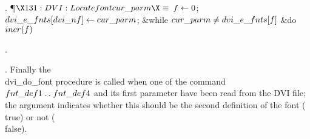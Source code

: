 . \P$\X131:DVI: Locate font \\{cur\_parm}\X\S$\6
$\|f\K0$;\5
$\\{dvi\_e\_fnts}[\\{dvi\_nf}]\K\\{cur\_parm}$;\6
\&{while} $\\{cur\_parm}\I\\{dvi\_e\_fnts}[\|f]$ \1\&{do}\5
$\\{incr}(\|f)$\2\par
{}.\fi

. Finally the \\{dvi\_do\_font} procedure is called when one of the
command
$\\{fnt\_def1}\to\\{fnt\_def4}$ and its first parameter have been read from the
\.{DVI} file; the argument indicates whether this should be the second
definition of the font (\\{true}) or not (\\{false}).

